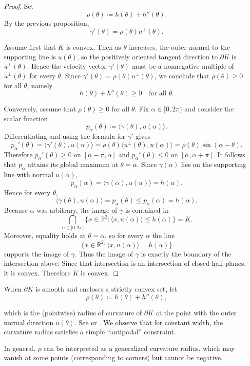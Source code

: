 \documentclass[11pt,letterpaper,reqno]{amsart}
\newcommand{\R}{\mathbb{R}}
\newcommand{\inner}[2]{\langle #1,#2\rangle}
\providecommand{\R}{\mathbb{R}}
\begin{document}
\begin{explanation}
\begin{proof}
Set
\[
\rho(\theta)\coloneqq h(\theta)+h''(\theta).
\]
By the previous proposition,
\[
\gamma'(\theta)=\rho(\theta)u^\perp(\theta).
\]

Assume first that $K$ is convex. Then as $\theta$ increases, the outer normal to the supporting line is $u(\theta)$, so the positively oriented tangent direction to $\partial K$ is $u^\perp(\theta)$. Hence the velocity vector $\gamma'(\theta)$ must be a nonnegative multiple of $u^\perp(\theta)$ for every $\theta$. Since $\gamma'(\theta)=\rho(\theta)u^\perp(\theta)$, we conclude that $\rho(\theta)\ge 0$ for all $\theta$, namely
\[
h(\theta)+h''(\theta)\ge 0 \quad \text{for all }\theta.
\]

Conversely, assume that $\rho(\theta)\ge 0$ for all $\theta$. Fix $\alpha\in[0,2\pi)$ and consider the scalar function
\[
p_\alpha(\theta)\coloneqq \inner{\gamma(\theta)}{u(\alpha)}.
\]
Differentiating and using the formula for $\gamma'$ gives
\[
p_\alpha'(\theta)=\inner{\gamma'(\theta)}{u(\alpha)}=\rho(\theta)\inner{u^\perp(\theta)}{u(\alpha)}=\rho(\theta)\sin(\alpha-\theta).
\]
Therefore $p_\alpha'(\theta)\ge 0$ on $[\alpha-\pi,\alpha]$ and $p_\alpha'(\theta)\le 0$ on $[\alpha,\alpha+\pi]$. It follows that $p_\alpha$ attains its global maximum at $\theta=\alpha$. Since $\gamma(\alpha)$ lies on the supporting line with normal $u(\alpha)$,
\[
p_\alpha(\alpha)=\inner{\gamma(\alpha)}{u(\alpha)}=h(\alpha).
\]
Hence for every $\theta$,
\[
\inner{\gamma(\theta)}{u(\alpha)}=p_\alpha(\theta)\le p_\alpha(\alpha)=h(\alpha).
\]
Because $\alpha$ was arbitrary, the image of $\gamma$ is contained in
\[
\bigcap_{\alpha\in[0,2\pi)}\{x\in\R^2:\inner{x}{u(\alpha)}\le h(\alpha)\}=K.
\]
Moreover, equality holds at $\theta=\alpha$, so for every $\alpha$ the line
\[
\{x\in\R^2:\inner{x}{u(\alpha)}=h(\alpha)\}
\]
supports the image of $\gamma$. Thus the image of $\gamma$ is exactly the boundary of the intersection above. Since that intersection is an intersection of closed half-planes, it is convex. Therefore $K$ is convex.
\end{proof}
\end{explanation}

When $\partial K$ is smooth and encloses a strictly convex set, let
\begin{equation}\label{rho}
    \rho(\theta)\coloneqq h(\theta)+h''(\theta),
\end{equation}

which is the (pointwise) radius of curvature of $\partial K$ at the point with the outer normal direction $u(\theta)$. See \cite[Theorem 5.1.1(d)--(e)]{Martini2019} or \cite[Corollary 2.5.3, formula (2.60)]{Schneider2014}. We observe that for constant width, the curvature radius satisfies a simple ``antipodal'' constraint.
\begin{explanation}
In general, $\rho$ can be interpreted as a generalized curvature radius, which may vanish at some points (corresponding to corners) but cannot be negative.
\end{explanation}
\end{document}
